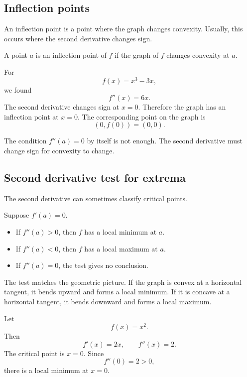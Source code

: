 \subsection*{Inflection points}

An inflection point is a point where the graph changes convexity. Usually, this occurs where the second derivative changes sign.

\begin{definitionbox}
A point \(a\) is an inflection point of \(f\) if the graph of \(f\) changes convexity at \(a\).
\end{definitionbox}

\begin{examplebox}
For
\[
f(x)=x^3-3x,
\]
we found
\[
f''(x)=6x.
\]
The second derivative changes sign at \(x=0\). Therefore the graph has an inflection point at \(x=0\). The corresponding point on the graph is
\[
(0,f(0))=(0,0).
\]
\end{examplebox}

The condition \(f''(a)=0\) by itself is not enough. The second derivative must change sign for convexity to change.

\subsection*{Second derivative test for extrema}

The second derivative can sometimes classify critical points.

\begin{theorembox}
Suppose \(f'(a)=0\).
\begin{itemize}
\item If \(f''(a)>0\), then \(f\) has a local minimum at \(a\).
\item If \(f''(a)<0\), then \(f\) has a local maximum at \(a\).
\item If \(f''(a)=0\), the test gives no conclusion.
\end{itemize}
\end{theorembox}

The test matches the geometric picture. If the graph is convex at a horizontal tangent, it bends upward and forms a local minimum. If it is concave at a horizontal tangent, it bends downward and forms a local maximum.

\begin{examplebox}
Let
\[
f(x)=x^2.
\]
Then
\[
f'(x)=2x,
\qquad
f''(x)=2.
\]
The critical point is \(x=0\). Since
\[
f''(0)=2>0,
\]
there is a local minimum at \(x=0\).
\end{examplebox}

